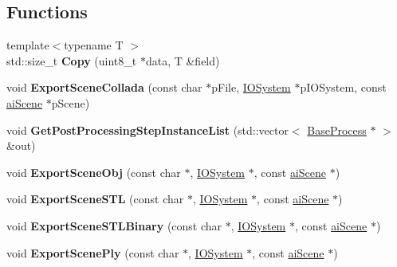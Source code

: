 \subsection*{Functions}
\begin{DoxyCompactItemize}
\item 
\hypertarget{namespace_assimp_a1242048c6931721405704fa72a056321}{{\footnotesize template$<$typename T $>$ }\\std\+::size\+\_\+t {\bfseries Copy} (uint8\+\_\+t $\ast$data, T \&field)}\label{namespace_assimp_a1242048c6931721405704fa72a056321}

\item 
\hypertarget{namespace_assimp_ad31d6c4f86478e5424d71b5693993583}{void {\bfseries Export\+Scene\+Collada} (const char $\ast$p\+File, \hyperlink{class_assimp_1_1_i_o_system}{I\+O\+System} $\ast$p\+I\+O\+System, const \hyperlink{structai_scene}{ai\+Scene} $\ast$p\+Scene)}\label{namespace_assimp_ad31d6c4f86478e5424d71b5693993583}

\item 
\hypertarget{namespace_assimp_ac346b524b4868a3700e756247dbaba15}{void {\bfseries Get\+Post\+Processing\+Step\+Instance\+List} (std\+::vector$<$ \hyperlink{class_assimp_1_1_base_process}{Base\+Process} $\ast$ $>$ \&out)}\label{namespace_assimp_ac346b524b4868a3700e756247dbaba15}

\item 
\hypertarget{namespace_assimp_a3ef2319b30736c8a8889b3b33434cb48}{void {\bfseries Export\+Scene\+Obj} (const char $\ast$, \hyperlink{class_assimp_1_1_i_o_system}{I\+O\+System} $\ast$, const \hyperlink{structai_scene}{ai\+Scene} $\ast$)}\label{namespace_assimp_a3ef2319b30736c8a8889b3b33434cb48}

\item 
\hypertarget{namespace_assimp_a5ef876901d5e55e2e97eb280f9e44602}{void {\bfseries Export\+Scene\+S\+T\+L} (const char $\ast$, \hyperlink{class_assimp_1_1_i_o_system}{I\+O\+System} $\ast$, const \hyperlink{structai_scene}{ai\+Scene} $\ast$)}\label{namespace_assimp_a5ef876901d5e55e2e97eb280f9e44602}

\item 
\hypertarget{namespace_assimp_ad67ca688ca641a50437c43d14eb010d3}{void {\bfseries Export\+Scene\+S\+T\+L\+Binary} (const char $\ast$, \hyperlink{class_assimp_1_1_i_o_system}{I\+O\+System} $\ast$, const \hyperlink{structai_scene}{ai\+Scene} $\ast$)}\label{namespace_assimp_ad67ca688ca641a50437c43d14eb010d3}

\item 
\hypertarget{namespace_assimp_a8692c74d797b3368f1cb9f7f65871673}{void {\bfseries Export\+Scene\+Ply} (const char $\ast$, \hyperlink{class_assimp_1_1_i_o_system}{I\+O\+System} $\ast$, const \hyperlink{structai_scene}{ai\+Scene} $\ast$)}\label{namespace_assimp_a8692c74d797b3368f1cb9f7f65871673}


\end{DoxyCompactItemize}
